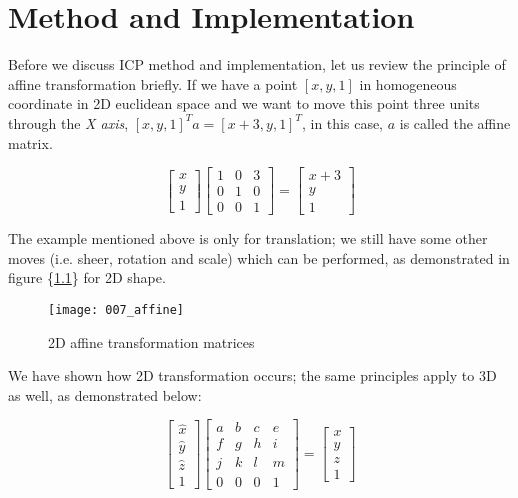 \documentclass[../structure.tex]{subfiles}
\begin{document}
\chapter{Method and Implementation}
\hspace{2em}Before we discuss ICP method and implementation, let us review the principle of affine transformation briefly. If we have a point $[x,y,1]$ in homogeneous coordinate in 2D euclidean space and we want to move this point three units through the \textit{X axis}, $[x,y,1]^T a = [x+3,y,1]^T$, in this case, $a$ is called the affine matrix.

\begin{equation*}
\begin{bmatrix}
x \\ y \\ 1
\end{bmatrix}
\begin{bmatrix}
1 & 0 & 3 \\
0 & 1 & 0 \\
0 & 0 & 1
\end{bmatrix}
=
\begin{bmatrix}
x + 3 \\ y \\ 1
\end{bmatrix}
\end{equation*}

The example mentioned above is only for translation; we still have some other moves (i.e. sheer, rotation and scale) which can be performed, as demonstrated in figure \{\ref{fig:affine}\} for 2D shape.

\begin{figure}[h!]
\centering
\texttt{[image: 007\_affine]}
\captionsetup{justification=centering}
\caption{2D affine transformation matrices \cite{Wikipedia2016}}
\label{fig:affine}
\end{figure}

We have shown how 2D transformation occurs; the same principles apply to 3D as well, as demonstrated below:

\begin{equation*}
\begin{bmatrix}
\hat{x} \\ \hat{y} \\ \hat{z} \\ 1
\end{bmatrix}
\begin{bmatrix}
a & b & c & e\\
f & g & h & i\\
j & k & l & m\\
0 & 0 & 0 & 1
\end{bmatrix}
=
\begin{bmatrix}
x \\ y \\ z \\ 1
\end{bmatrix}
\end{equation*}
\end{document}
